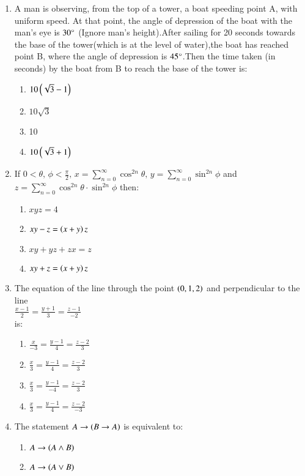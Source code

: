 \documentclass[journal,12pt,twocolumn]{IEEEtran}
\theoremstyle{remark}
\begin{document}
\begin{enumerate}
\begin{enumerate}
\end{enumerate}
\item A man is observing, from the top of a tower, a boat speeding point A, with uniform speed. At that point, the angle of depression of the boat with the man's eye is $30\degree$ (Ignore man's height).After sailing for 20 seconds towards the base of the tower(which is at the level of water),the boat has reached point B, where the angle of depression is $45\degree$.Then the time taken (in seconds) by the boat from B to reach the base of the tower is$\colon$
\begin{enumerate}
    \item $10\left(\sqrt{3}-1\right)$
    \item $10\sqrt{3}$
    \item 10
    \item $10\left(\sqrt{3}+1\right)$
\end{enumerate}
\item If $0\!<\theta, \, \phi < \frac{\pi}{2}, \,x=\sum_{n=0}^{\infty} \cos^{2n} \theta, \, y = \sum_{n=0}^{\infty} \sin^{2n} \phi $ and $z = \sum_{n=0}^{\infty} \cos^{2n} \theta \cdot \sin^{2n} \phi$ then$\colon$
\begin{enumerate}
    \item $xyz=4$
    \item $xy-z=\left(x+y\right)z$
    \item $xy+yz+zx=z$
    \item $xy+z=\left(x+y\right)z$
\end{enumerate}
\item The equation of the line through the point $\left(0,1,2\right)$ and perpendicular to the line\\$\frac{x-1}{2}=\frac{y+1}{3}=\frac{z-1}{-2}$\\is$\colon$
\begin{enumerate}
    \item $\frac{x}{-3}=\frac{y-1}{4}=\frac{z-2}{3}$
    \item $\frac{x}{3}=\frac{y-1}{4}=\frac{z-2}{3}$
    \item $\frac{x}{3}=\frac{y-1}{-4}=\frac{z-2}{3}$
    \item $\frac{x}{3}=\frac{y-1}{4}=\frac{z-2}{-3}$
\end{enumerate}
\item The statement $A\to\left(B\to A\right)$ is equivalent to$\colon$
\begin{enumerate}
    \item $A\to\left(A\land B\right)$
    \item $A\to\left(A\lor B\right)$

\end{enumerate}
\end{enumerate}
\end{document}
